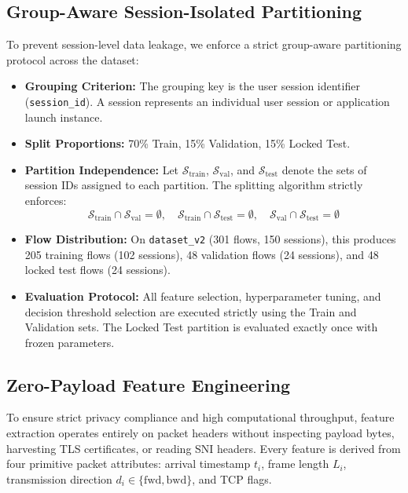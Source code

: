 \documentclass[conference]{IEEEtran}
\begin{document}
\subsection{Group-Aware Session-Isolated Partitioning}
To prevent session-level data leakage, we enforce a strict group-aware partitioning protocol across the dataset:
\begin{itemize}
    \item \textbf{Grouping Criterion:} The grouping key is the user session identifier (\texttt{session\_id}). A session represents an individual user session or application launch instance.
    \item \textbf{Split Proportions:} 70\% Train, 15\% Validation, 15\% Locked Test.
    \item \textbf{Partition Independence:} Let $\mathcal{S}_{\text{train}}$, $\mathcal{S}_{\text{val}}$, and $\mathcal{S}_{\text{test}}$ denote the sets of session IDs assigned to each partition. The splitting algorithm strictly enforces:
    \begin{equation}
        \mathcal{S}_{\text{train}} \cap \mathcal{S}_{\text{val}} = \emptyset, \quad \mathcal{S}_{\text{train}} \cap \mathcal{S}_{\text{test}} = \emptyset, \quad \mathcal{S}_{\text{val}} \cap \mathcal{S}_{\text{test}} = \emptyset
    \end{equation}
    \item \textbf{Flow Distribution:} On \texttt{dataset\_v2} (301 flows, 150 sessions), this produces 205 training flows (102 sessions), 48 validation flows (24 sessions), and 48 locked test flows (24 sessions).
    \item \textbf{Evaluation Protocol:} All feature selection, hyperparameter tuning, and decision threshold selection are executed strictly using the Train and Validation sets. The Locked Test partition is evaluated exactly once with frozen parameters.
\end{itemize}

\subsection{Zero-Payload Feature Engineering}
To ensure strict privacy compliance and high computational throughput, feature extraction operates entirely on packet headers without inspecting payload bytes, harvesting TLS certificates, or reading SNI headers. Every feature is derived from four primitive packet attributes: arrival timestamp $t_i$, frame length $L_i$, transmission direction $d_i \in \{\text{fwd}, \text{bwd}\}$, and TCP flags.
\end{document}
